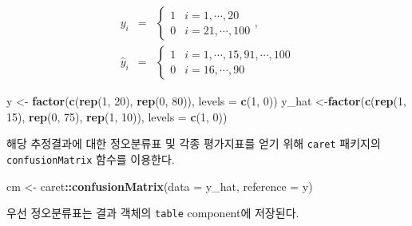 \documentclass[]{book}
\newenvironment{Shaded}{\begin{snugshade}}{\end{snugshade}}
\newcommand{\DataTypeTok}[1]{\textcolor[rgb]{0.13,0.29,0.53}{#1}}
\newcommand{\DecValTok}[1]{\textcolor[rgb]{0.00,0.00,0.81}{#1}}
\newcommand{\KeywordTok}[1]{\textcolor[rgb]{0.13,0.29,0.53}{\textbf{#1}}}
\newcommand{\NormalTok}[1]{#1}
\newcommand{\OperatorTok}[1]{\textcolor[rgb]{0.81,0.36,0.00}{\textbf{#1}}}
\newcommand{\StringTok}[1]{\textcolor[rgb]{0.31,0.60,0.02}{#1}}
\begin{document}
\begin{eqnarray*}
y_i &=& \begin{cases}
1 & i = 1, \cdots, 20\\
0 & i = 21, \cdots, 100
\end{cases},\\
\hat{y}_i &=& \begin{cases}
1 & i = 1, \cdots, 15, 91, \cdots, 100\\
0 & i = 16, \cdots, 90
\end{cases}
\end{eqnarray*}

\begin{Shaded}
\begin{Highlighting}[]
\NormalTok{y <-}\StringTok{ }\KeywordTok{factor}\NormalTok{(}\KeywordTok{c}\NormalTok{(}\KeywordTok{rep}\NormalTok{(}\DecValTok{1}\NormalTok{, }\DecValTok{20}\NormalTok{), }\KeywordTok{rep}\NormalTok{(}\DecValTok{0}\NormalTok{, }\DecValTok{80}\NormalTok{)), }\DataTypeTok{levels =} \KeywordTok{c}\NormalTok{(}\DecValTok{1}\NormalTok{, }\DecValTok{0}\NormalTok{))}
\NormalTok{y_hat <-}\KeywordTok{factor}\NormalTok{(}\KeywordTok{c}\NormalTok{(}\KeywordTok{rep}\NormalTok{(}\DecValTok{1}\NormalTok{, }\DecValTok{15}\NormalTok{), }\KeywordTok{rep}\NormalTok{(}\DecValTok{0}\NormalTok{, }\DecValTok{75}\NormalTok{), }\KeywordTok{rep}\NormalTok{(}\DecValTok{1}\NormalTok{, }\DecValTok{10}\NormalTok{)), }\DataTypeTok{levels =} \KeywordTok{c}\NormalTok{(}\DecValTok{1}\NormalTok{, }\DecValTok{0}\NormalTok{))}
\end{Highlighting}
\end{Shaded}

해당 추정결과에 대한 정오분류표 및 각종 평가지표를 얻기 위해 \texttt{caret} 패키지의 \texttt{confusionMatrix} 함수를 이용한다.

\begin{Shaded}
\begin{Highlighting}[]
\NormalTok{cm <-}\StringTok{ }\NormalTok{caret}\OperatorTok{::}\KeywordTok{confusionMatrix}\NormalTok{(}\DataTypeTok{data =}\NormalTok{ y_hat, }\DataTypeTok{reference =}\NormalTok{ y)}
\end{Highlighting}
\end{Shaded}

우선 정오분류표는 결과 객체의 \texttt{table} component에 저장된다.

\begin{Shaded}
\end{Shaded}
\end{document}
